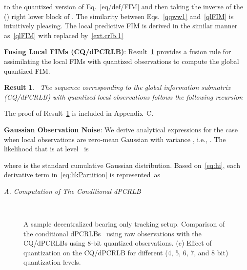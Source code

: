 \documentclass[10pt,twocolumn,twoside]{IEEEtran}
\newtheorem{rst}{Result}
\begin{document}
to the quantized version of Eq.~\eqref{eq/def/FIM} and then taking the
inverse of the () right lower block of
.  The similarity
between Eqs.~\eqref{qqww1} and~\eqref{qlFIM} is intuitively pleasing.
The local predictive FIM  is derived in the similar
manner as~\eqref{qlFIM} with  replaced
by~\eqref{ext.crlb.1} 

\vspace{.05in}
\noindent
\textbf{Fusing Local FIMs (CQ/dPCRLB)}: Result~\ref{qdPCRLB} provides
a fusion rule for assimilating the local FIMs with quantized
observations to compute the global quantized FIM.
\begin{rst}\label{qdPCRLB}~The sequence 
corresponding to the global information submatrix (CQ/dPCRLB) with
quantized local observations follows the following recursion

\end{rst}
\noindent
The proof of Result~\ref{qdPCRLB} is included in Appendix~C.

\vspace{.05in}
\noindent
\textbf{Gaussian Observation Noise}: We derive analytical expressions
for the case when local observations  are zero-mean Gaussian
with variance , i.e., .  The
likelihood that  is at level ~is

where  is the standard cumulative Gaussian distribution.  Based on~\eqref{eq:hi}, each derivative term in~\eqref{eq:likPartition} is represented~as



\noindent
\textit{A. Computation of The Conditional dPCRLB}
\begin{figure*}[th]
\centering
\mbox{
}
\caption{\label{fig1}  A sample decentralized bearing only
  tracking setup.  Comparison of the conditional
  dPCRLBs~\cite{Arash:SPL} using raw observations with the CQ/dPCRLBs
  using 8-bit quantized observations. (c) Effect of quantization on
  the CQ/dPCRLB for different (4, 5, 6, 7, and 8 bit) quantization
  levels.}
\vspace{-.1in}
\end{figure*}
\end{document}
